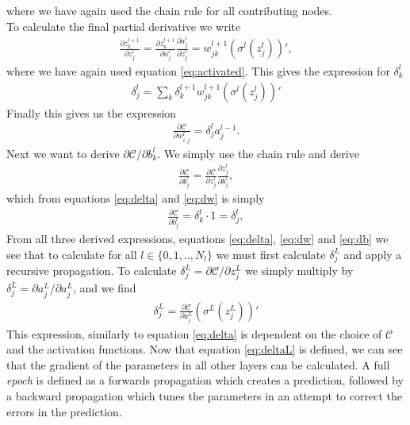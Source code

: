 where we have again used the chain rule for all contributing nodes.
\\
To calculate the final partial derivative we write
\begin{align*}
    \frac{\partial z_k^{l+1}}{\partial z^l_j} = \frac{\partial z_k^{l+1}}{\partial a^l_j}\frac{\partial a^l_j}{\partial z^l_j}
                                              = w_{jk}^{l+1}(\sigma^l(z_j^l))',
\end{align*}
where we have again used equation \ref{eq:activated}.
This gives the expression for $\delta_k^l$
\begin{align}\label{eq:delta}
    \delta_j^l  = \sum_k \delta_k^{l+1}w_{jk}^{l+1}(\sigma^l(z_j^l))'  
\end{align}
Finally this gives us the expression
\begin{align}\label{eq:dw}
    \frac{\partial \mathcal{C}}{\partial w_{i,j}^l} = \delta_j^{l} a_j^{l-1}.
\end{align}
Next we want to derive $\partial \mathcal{C}/\partial b^l_k$. We simply use the chain rule and derive
\begin{align*}
    \frac{\partial \mathcal{C}}{\partial b^l_j} = \frac{\partial \mathcal{C}}{\partial z^l_j}\frac{\partial z_j^l}{\partial b^l_j},
\end{align*}
which from equations \ref{eq:delta} and \ref{eq:dw} is simply
\begin{align}\label{eq:db}
    \frac{\partial \mathcal{C}}{\partial b^l_j} = \delta_k^{l} \cdot 1 = \delta_j^{l},
\end{align}
From all three derived expressions, equations \ref{eq:delta}, \ref{eq:dw} and \ref{eq:db} we see that 
to calculate for all $l\in\{0,1,..,N_l\}$ we must first calculate $\delta_j^L$ and apply a recursive propagation.
To calculate $\delta_j^L = \partial \mathcal{C}/\partial z^L_j$ we simply multiply by $\delta_j^L = \partial a_j^L/\partial a_j^L$, and we find
\begin{align}\label{eq:deltaL}
    \delta_j^L = \frac{\partial \mathcal{C}}{\partial a^L_j}\left(\sigma^L(z_j^L)\right)'
\end{align}
This expression, similarly to equation \ref{eq:delta} is dependent on the choice of $\mathcal{C}$ and 
the activation functions. Now that equation \ref{eq:deltaL} is defined, we can see that the
gradient of the parameters in all other layers can be calculated. A full \emph{epoch} is defined as 
a forwards propagation which creates a prediction, followed by a backward propagation which tunes the parameters 
in an attempt to correct the errors in the prediction.
